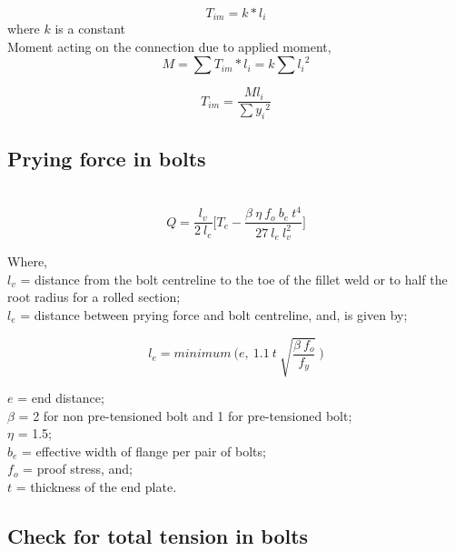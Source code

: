 \documentclass[11.5pt,a4paper,oneside]{report}
\begin{document}
\begin{Form}
\begin{equation}
	T_{im} = k * l_i 
\end{equation}
where $k$ is a constant\\
Moment acting on the connection due to applied moment, 
\begin{equation}
	M =  \sum T_{im} * l_i  = k \sum {l_i}^2
\end{equation}

\begin{equation}
	T_{im} = \frac {M l_i} {\sum {y_i}^2}
\end{equation}
\subsection{Prying force in bolts}
\quad \quad[Reference: Cl. 10.4.7, IS 800:2007] \\

\begin{equation}
	Q = \frac{l_v}{2~l_e} \bigg [T_e - \frac{\beta~ \eta~ f_o~b_e~t^{4}}{27~ l_e~l_v^{2}} \bigg]
\end{equation}

Where, \\
\indent $l_v$ = distance from the bolt centreline to the toe of the fillet weld or to half the root radius for a rolled section;\\
\indent $l_e$ = distance between prying force and bolt centreline, and, is given by;

\begin{equation}
	l_e = minimum~ \Bigg(e,~1.1~t~ \sqrt{\frac{\beta~f_o}{f_y}}~ \Bigg)
\end{equation}

\indent $e$ = end distance; \\
\indent $\beta$ = 2 for non pre-tensioned bolt and 1 for pre-tensioned bolt; \\
\indent $\eta$ = 1.5; \\
\indent $b_e$ = effective width of flange per pair of bolts; \\
\indent $f_o$ = proof stress, and; \\
\indent $t$ = thickness of the end plate. \\






\subsection{Check for total tension in bolts}



\end{Form}
\end{document}

